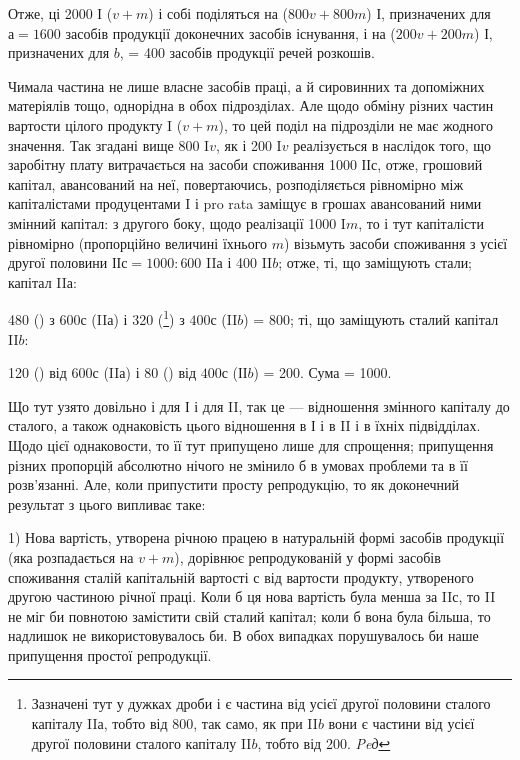 Отже, ці 2000 І ($v + m$) і собі поділяться на ($800 v + 800 m$) І,
призначених для $а = 1600$ засобів продукції доконечних засобів існування,
і на ($200 v + 200 m$) І, призначених для $b$, = 400 засобів продукції
речей розкошів.

Чимала частина не лише власне засобів праці, а й сировинних та
допоміжних матеріялів тощо, однорідна в обох підрозділах. Але щодо
обміну різних частин вартости цілого продукту I ($v + m$), то цей поділ
на підрозділи не має жодного значення. Так згадані вище 800 I$v$, як і
200 I$v$ реалізується в наслідок того, що заробітну плату витрачається
на засоби споживання 1000 ІІ$с$, отже, грошовий капітал, авансований на
неї, повертаючись, розподіляється рівномірно між капіталістами продуцентами
I і pro rata заміщує в грошах авансований ними змінний капітал:
з другого боку, щодо реалізації 1000 I$m$, то і тут капіталісти рівномірно
(пропорційно величині їхнього $m$) візьмуть засоби споживання з
усієї другої половини ІІ$с = 1000: 600$ II$а$ і 400 II$b$; отже, ті, що заміщують
стали; капітал II$а$:

480 () з 600$с$ (II$а$) і 320 (\footnote*{
Зазначені тут у дужках дроби  і  є частина від усієї другої половини
сталого капіталу II$а$, тобто від 800, так само, як при II$b$ вони є частини від усієї
другої половини сталого капіталу II$b$, тобто від 200. \emph{Peд}
}) з $400с$ (II$b$) = 800; ті, що заміщують
сталий капітал II$b$:

120 () від $600 с$ (II$а$) і 80 () від $400 с$ (ІІ$b$) = 200. Сума = 1000.

Що тут узято довільно і для І і для II, так це — відношення змінного
капіталу до сталого, а також однаковість цього відношення в
І і в II і в їхніх підвідділах. Щодо цієї однаковости, то її тут припущено
лише для спрощення; припущення різних пропорцій абсолютно нічого
не змінило б в умовах проблеми та в її розв’язанні. Але, коли припустити
просту репродукцію, то як доконечний результат з цього випливає таке:

1) Нова вартість, утворена річною працею в натуральній формі засобів
продукції (яка розпадається на $v + m$), дорівнює репродукованій
у формі засобів споживання сталій капітальній вартості $с$ від вартости
продукту, утвореного другою частиною річної праці. Коли б ця нова вартість
була менша за II$с$, то II не міг би повнотою замістити свій сталий капітал;
коли б вона була більша, то надлишок не використовувалось би. В
обох випадках порушувалось би наше припущення простої репродукції.

